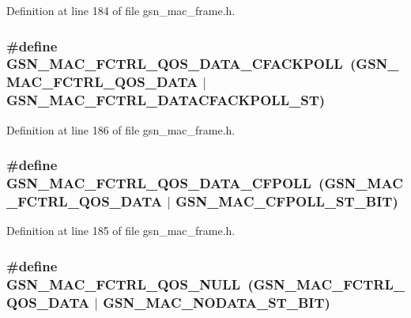 Definition at line 184 of file gsn\_\-mac\_\-frame.h.

\hypertarget{a00523_a25b09a77147518ccdeeab10b3abcd4ed}{
\subsubsection[{GSN\_\-MAC\_\-FCTRL\_\-QOS\_\-DATA\_\-CFACKPOLL}]{\setlength{\rightskip}{0pt plus 5cm}\#define GSN\_\-MAC\_\-FCTRL\_\-QOS\_\-DATA\_\-CFACKPOLL~(GSN\_\-MAC\_\-FCTRL\_\-QOS\_\-DATA  $|$ GSN\_\-MAC\_\-FCTRL\_\-DATACFACKPOLL\_\-ST)}}
\label{a00523_a25b09a77147518ccdeeab10b3abcd4ed}


Definition at line 186 of file gsn\_\-mac\_\-frame.h.

\hypertarget{a00523_a0ff7b5404245e5ca5eced53a6e388bf6}{
\subsubsection[{GSN\_\-MAC\_\-FCTRL\_\-QOS\_\-DATA\_\-CFPOLL}]{\setlength{\rightskip}{0pt plus 5cm}\#define GSN\_\-MAC\_\-FCTRL\_\-QOS\_\-DATA\_\-CFPOLL~(GSN\_\-MAC\_\-FCTRL\_\-QOS\_\-DATA  $|$ GSN\_\-MAC\_\-CFPOLL\_\-ST\_\-BIT)}}
\label{a00523_a0ff7b5404245e5ca5eced53a6e388bf6}


Definition at line 185 of file gsn\_\-mac\_\-frame.h.

\hypertarget{a00523_aa1c6dd9b0559c27d39f25e20a3855aed}{
\subsubsection[{GSN\_\-MAC\_\-FCTRL\_\-QOS\_\-NULL}]{\setlength{\rightskip}{0pt plus 5cm}\#define GSN\_\-MAC\_\-FCTRL\_\-QOS\_\-NULL~(GSN\_\-MAC\_\-FCTRL\_\-QOS\_\-DATA  $|$ GSN\_\-MAC\_\-NODATA\_\-ST\_\-BIT)}}
\label{a00523_aa1c6dd9b0559c27d39f25e20a3855aed}


